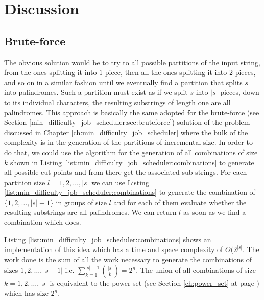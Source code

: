 \section{Discussion}
\label{palindrome_partitioning2:sec:discussion}


\subsection{Brute-force}
\label{palindrome_partitioning2:sec:bruteforce}
The obvious solution would be to try to all possible partitions of the input string, from
the ones splitting it into $1$ piece, then all the ones splitting it into $2$ pieces, and so on in a
similar fashion until we eventually find a partition that splits $s$ into palindromes. Such a
partition must exist as if we split $s$ into $|s|$ pieces, down to its individual characters, the
resulting substrings of length one are all palindromes. This approach is basically the same adopted
for the brute-force (see Section \ref{min_difficulty_job_scheduler:sec:bruteforce}) solution of the
problem discussed in Chapter \ref{ch:min_difficulty_job_scheduler} where the bulk of the complexity
is in the generation of the partitions of incremental size. In order to do that, we could use the
algorithm for the generation of all combinations of size $k$ shown in Listing
\ref{list:min_difficulty_job_scheduler:combinations} to generate all possible cut-points and from
there get the associated sub-strings. For each partition size $l = 1,2,\ldots,|s|$ we can use
Listing \ref{list:min_difficulty_job_scheduler:combinations} to generate the combination of
$\{1,2,\ldots,|s|-1\}$ in groups of size $l$ and for each of them evaluate whether the resulting
substrings are all palindromes. We can return $l$ as soon as we find a combination which does.

Listing \ref{list:min_difficulty_job_scheduler:combinations} shows an implementation of this idea
which has a time and space complexity of $O(2^{|s|}$. The work done is the sum of all the work
necessary to generate the combinations of sizes $1,2,\ldots,|s-1|$ i.e. $\sum_{k=1}^{|s|-1} {|s|
\choose k} = 2^n$. The union of all combinations of size $k=1,2,\ldots,|s|$ is equivalent to the
power-set (see Section \ref{ch:power_set} at page \pageref{sec:powerset:discussion}) which has size
$2^n$.




